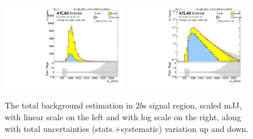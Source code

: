 \begin{figure}
\begin{center}
\includegraphics[width=0.48\textwidth,angle=-90]{figures/boosted/Signal_Syst/Moriond_bkg_9_TwoTag_split_Signal_mHH_pole_blind.pdf}
\includegraphics[width=0.48\textwidth,angle=-90]{figures/boosted/Signal_Syst/Moriond_bkg_9_TwoTag_split_Signal_mHH_pole_1_blind.pdf}
\caption{The total background estimation in $2b$s signal region, scaled mJJ, with linear scale on the left and with log scale on the right, along with total uncertainties (stats.$+$systematic) variation up and down.}
\label{fig:FinalBkg_sys-2b-pole}
\end{center}
\end{figure}
